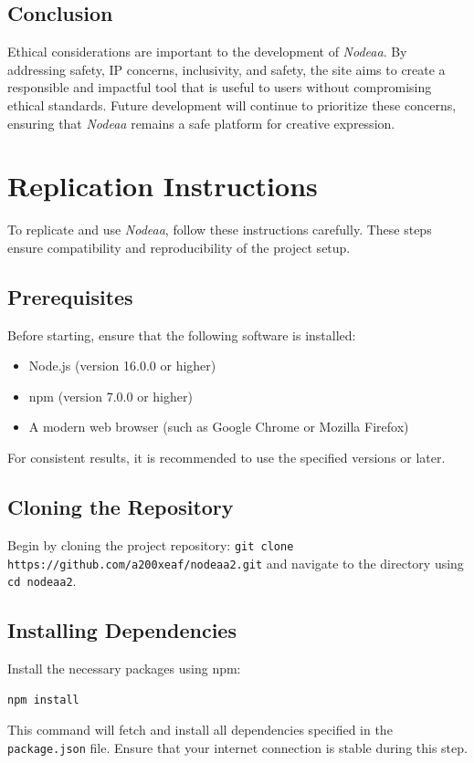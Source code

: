 \documentclass[10pt,twocolumn]{article}
\begin{document}
\subsection{Conclusion}
Ethical considerations are important to the development of \textit{Nodeaa}. By addressing safety, IP concerns, inclusivity, and safety, the site aims to create a responsible and impactful tool that is useful to users without compromising ethical standards. Future development will continue to prioritize these concerns, ensuring that \textit{Nodeaa} remains a safe platform for creative expression.

\appendix
\section{Replication Instructions}

To replicate and use \textit{Nodeaa}, follow these instructions carefully. These steps ensure compatibility and reproducibility of the project setup.

\subsection{Prerequisites}
Before starting, ensure that the following software is installed:
\begin{itemize}
    \item Node.js (version 16.0.0 or higher)
    \item npm (version 7.0.0 or higher)
    \item A modern web browser (such as Google Chrome or Mozilla Firefox)
\end{itemize}
For consistent results, it is recommended to use the specified versions or later.

\subsection{Cloning the Repository}

Begin by cloning the project repository: \texttt{git clone https://github.com/a200xeaf/nodeaa2.git} and navigate to the directory using \texttt{cd nodeaa2}.

\subsection{Installing Dependencies}

Install the necessary packages using npm:
\begin{verbatim}
npm install
\end{verbatim}
This command will fetch and install all dependencies specified in the \texttt{package.json} file. Ensure that your internet connection is stable during this step.
\end{document}
